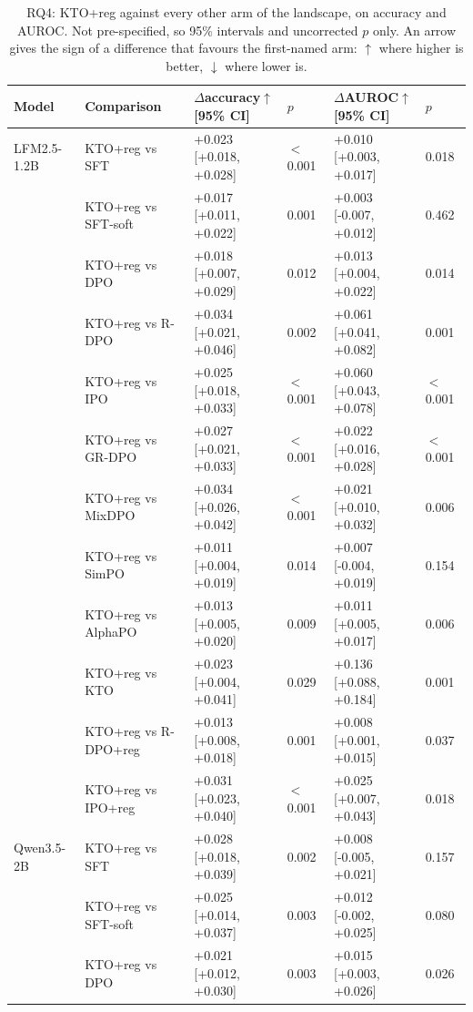\begin{table}[t]
\centering
\caption{RQ4: KTO+reg against every other arm of the landscape, on accuracy and AUROC. Not pre-specified, so 95\% intervals and uncorrected $p$ only. An arrow gives the sign of a difference that favours the first-named arm: $\uparrow$ where higher is better, $\downarrow$ where lower is.}
\label{tab:placement}
\scriptsize
\begin{tabular}{llllll}
\toprule
Model & Comparison & $\Delta$accuracy$\uparrow$ [95\% CI] & $p$ & $\Delta$AUROC$\uparrow$ [95\% CI] & $p$ \\
\midrule
LFM2.5-1.2B & KTO+reg vs SFT & +0.023 [+0.018, +0.028] & $<$0.001 & +0.010 [+0.003, +0.017] & 0.018 \\
 & KTO+reg vs SFT-soft & +0.017 [+0.011, +0.022] & 0.001 & +0.003 [-0.007, +0.012] & 0.462 \\
 & KTO+reg vs DPO & +0.018 [+0.007, +0.029] & 0.012 & +0.013 [+0.004, +0.022] & 0.014 \\
 & KTO+reg vs R-DPO & +0.034 [+0.021, +0.046] & 0.002 & +0.061 [+0.041, +0.082] & 0.001 \\
 & KTO+reg vs IPO & +0.025 [+0.018, +0.033] & $<$0.001 & +0.060 [+0.043, +0.078] & $<$0.001 \\
 & KTO+reg vs GR-DPO & +0.027 [+0.021, +0.033] & $<$0.001 & +0.022 [+0.016, +0.028] & $<$0.001 \\
 & KTO+reg vs MixDPO & +0.034 [+0.026, +0.042] & $<$0.001 & +0.021 [+0.010, +0.032] & 0.006 \\
 & KTO+reg vs SimPO & +0.011 [+0.004, +0.019] & 0.014 & +0.007 [-0.004, +0.019] & 0.154 \\
 & KTO+reg vs AlphaPO & +0.013 [+0.005, +0.020] & 0.009 & +0.011 [+0.005, +0.017] & 0.006 \\
 & KTO+reg vs KTO & +0.023 [+0.004, +0.041] & 0.029 & +0.136 [+0.088, +0.184] & 0.001 \\
 & KTO+reg vs R-DPO+reg & +0.013 [+0.008, +0.018] & 0.001 & +0.008 [+0.001, +0.015] & 0.037 \\
 & KTO+reg vs IPO+reg & +0.031 [+0.023, +0.040] & $<$0.001 & +0.025 [+0.007, +0.043] & 0.018 \\
\addlinespace
Qwen3.5-2B & KTO+reg vs SFT & +0.028 [+0.018, +0.039] & 0.002 & +0.008 [-0.005, +0.021] & 0.157 \\
 & KTO+reg vs SFT-soft & +0.025 [+0.014, +0.037] & 0.003 & +0.012 [-0.002, +0.025] & 0.080 \\
 & KTO+reg vs DPO & +0.021 [+0.012, +0.030] & 0.003 & +0.015 [+0.003, +0.026] & 0.026 \\

\end{tabular}
\end{table}
